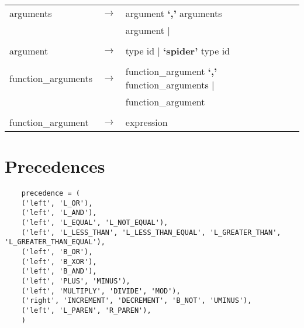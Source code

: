 \documentclass[landscape]{article}
\begin{document}
\begin{longtable}{ l c l}
    \\

    arguments & \ensuremath{\to} &  argument  \textbf{`,'} arguments    \\
    & &  argument   | \\

    \\

    argument & \ensuremath{\to} &  type  id  | \textbf{`spider'} type  id   \\

    \\

    function\_arguments & \ensuremath{\to} &  function\_argument  \textbf{`,'} function\_arguments   | \\
    & &  function\_argument    \\

    \\

    function\_argument & \ensuremath{\to} &  expression  \\

  \end{longtable}

  \section{Precedences}
  \begin{verbatim}
    precedence = (
    ('left', 'L_OR'),
    ('left', 'L_AND'),
    ('left', 'L_EQUAL', 'L_NOT_EQUAL'),
    ('left', 'L_LESS_THAN', 'L_LESS_THAN_EQUAL', 'L_GREATER_THAN', 'L_GREATER_THAN_EQUAL'),
    ('left', 'B_OR'),
    ('left', 'B_XOR'),
    ('left', 'B_AND'),
    ('left', 'PLUS', 'MINUS'),
    ('left', 'MULTIPLY', 'DIVIDE', 'MOD'),
    ('right', 'INCREMENT', 'DECREMENT', 'B_NOT', 'UMINUS'),
    ('left', 'L_PAREN', 'R_PAREN'),
    )
  \end{verbatim}
\end{document}
